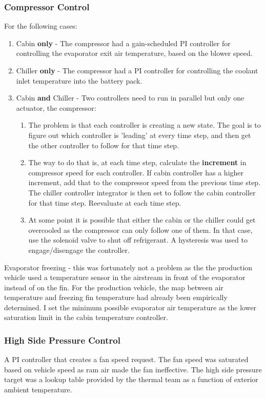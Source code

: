 \subsubsection * {Compressor Control}
For the following cases:
\begin{enumerate}
  \item Cabin \textbf{only} - The compressor had a gain-scheduled PI controller for controlling the evaporator exit air temperature, based on the blower speed.
  \item Chiller \textbf{only} - The compressor had a PI controller for controlling the coolant inlet temperature into the battery pack.
  \item Cabin \textbf{and} Chiller - Two controllers need to run in parallel but only one actuator, the compressor:
  \begin{enumerate}
  \item The problem is that each controller is creating a new state. The goal is to figure out which controller is 'leading' at every time step, and then get the other controller to follow for that time step.
  \item The way to do that is, at each time step, calculate the \textbf{increment} in compressor speed for each controller. If cabin controller has a higher increment, add that to the compressor speed from the previous time step. The chiller controller integrator is then set to follow the cabin controller for that time step. Reevaluate at each time step.
  \item At some point it is possible that either the cabin or the chiller could get overcooled as the compressor can only follow one of them. In that case, use the solenoid valve to shut off refrigerant. A hysteresis was used to engage/disengage the controller.
\end{enumerate}
\end{enumerate}

\noindent
Evaporator freezing - this was fortunately not a problem as the the production vehicle used a temperature sensor in the airstream in front of the evaporator instead of on the fin. For the production vehicle, the map between air temperature and freezing fin temperature had already been empirically determined. I set the minimum possible evaporator air temperature as the lower saturation limit in the cabin temperature controller.

\subsubsection * {High Side Pressure Control}
A PI controller that creates a fan speed request. The fan speed was saturated based on vehicle speed as ram air made the fan ineffective. The high side pressure target was a lookup table provided by the thermal team as a function of exterior ambient temperature.

